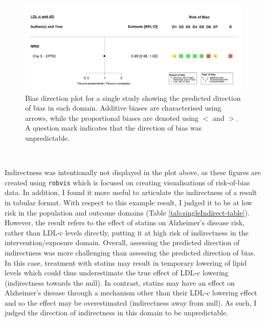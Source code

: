 \documentclass[a4paper, twoside]{templates/ociamthesis}
\begin{document}
~\\




\begin{figure}[H]
\includegraphics[width=1\linewidth]{figures/tri/midlife_AD_single} \caption[Bias direction plot example for a single study]{Bias direction plot for a single study showing the predicted direction of bias in each domain. Additive biases are characterised using arrows, while the proportional biases are denoted using \(<\) and \(>\). A question mark indicates that the direction of bias was unpredictable.}\label{fig:biasDirectionSingle}
\end{figure}

~

Indirectness was intentionally not displayed in the plot above, as these figures are created using \texttt{robvis} which is focused on creating visualisations of risk-of-bias data. In addition, I found it more useful to articulate the indirectness of a result in tabular format. With respect to this example result, I judged it to be at low risk in the population and outcome domains (Table \ref{tab:singleIndirect-table}). However, the result refers to the effect of statins on Alzheimer's disease risk, rather than LDL-c levels directly, putting it at high risk of indirectness in the intervention/exposure domain. Overall, assessing the predicted direction of indirectness was more challenging than assessing the predicted direction of bias. In this case, treatment with statins may result in temporary lowering of lipid levels which could thus underestimate the true effect of LDL-c lowering (indirectness towards the null). In contrast, statins may have an effect on Alzheimer's disease through a mechanism other than their LDL-c lowering effect and so the effect may be overestimated (indirectness away from null). As such, I judged the direction of indirectness in this domain to be unpredictable.

~\\
\end{document}
